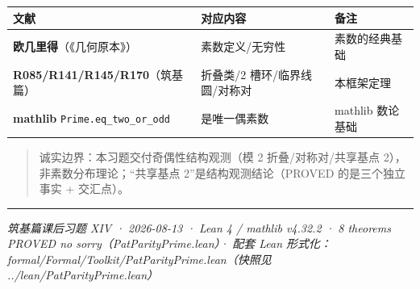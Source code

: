 \documentclass[
]{article}
\newcounter{none} %
\begin{document}
{\def\LTcaptype{none} %
\begin{longtable}[]{@{}
  >{\raggedright\arraybackslash}p{}
  >{\raggedright\arraybackslash}p{}
  >{\raggedright\arraybackslash}p{}@{}}
\toprule\noalign{}
\begin{minipage}[b]{\linewidth}\raggedright
文献
\end{minipage} & \begin{minipage}[b]{\linewidth}\raggedright
对应内容
\end{minipage} & \begin{minipage}[b]{\linewidth}\raggedright
备注
\end{minipage} \\
\midrule\noalign{}
\endhead
\bottomrule\noalign{}
\endlastfoot
\textbf{欧几里得}（《几何原本》） & 素数定义/无穷性 & 素数的经典基础 \\
\textbf{R085/R141/R145/R170}（筑基篇） & 折叠类/2 槽环/临界线圆/对称对 &
本框架定理 \\
\textbf{mathlib} \texttt{Prime.eq\_two\_or\_odd} & 2 是唯一偶素数 &
mathlib 数论基础 \\
\end{longtable}
}

\begin{quote}
诚实边界：本习题交付奇偶性结构观测（模 2 折叠/对称对/共享基点
2），非素数分布理论；``共享基点 2''是结构观测结论（PROVED
的是三个独立事实 + 交汇点）。
\end{quote}

\begin{center}\rule{0.5\linewidth}{0.5pt}\end{center}

\emph{筑基篇课后习题 XIV · 2026-08-13 · Lean 4 / mathlib v4.32.2 · 8
theorems PROVED no sorry（PatParityPrime.lean）· 配套 Lean
形式化：formal/Formal/Toolkit/PatParityPrime.lean（快照见
../lean/PatParityPrime.lean）}
\end{document}
